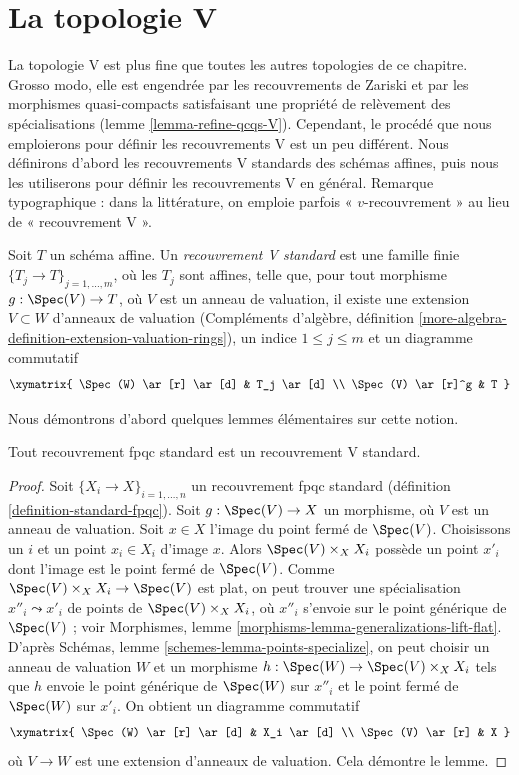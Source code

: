 \section{La topologie V}
\label{section-V}

\noindent
La topologie V est plus fine que toutes les autres topologies de ce chapitre.
Grosso modo, elle est engendrée par les recouvrements de Zariski et
par les morphismes quasi-compacts satisfaisant une propriété de relèvement
des spécialisations (lemme \ref{lemma-refine-qcqs-V}).
Cependant, le procédé que nous emploierons pour définir les recouvrements V est un peu différent.
Nous définirons d'abord les recouvrements V standards des schémas affines, puis
nous les utiliserons pour définir les recouvrements V en général. Remarque typographique :
dans la littérature, on emploie parfois « $v$-recouvrement » au lieu de « recouvrement V ».

\begin{definition}
\label{definition-standard-V-covering}
Soit $T$ un schéma affine. Un {\it recouvrement V standard} est une famille finie
$\{T_j \to T\}_{j = 1, \ldots, m}$, où les $T_j$ sont affines,
telle que, pour tout morphisme $g : \Spec(V) \to T$, où $V$
est un anneau de valuation, il existe une extension $V \subset W$ d'anneaux de valuation
(Compléments d'algèbre, définition
\ref{more-algebra-definition-extension-valuation-rings}),
un indice $1 \leq j \leq m$ et un diagramme commutatif
$$
\xymatrix{
\Spec(W) \ar[r] \ar[d] & T_j \ar[d] \\
\Spec(V) \ar[r]^g & T
}
$$
\end{definition}

\noindent
Nous démontrons d'abord quelques lemmes élémentaires sur cette notion.

\begin{lemma}
\label{lemma-standard-fpqc-standard-V}
Tout recouvrement fpqc standard est un recouvrement V standard.
\end{lemma}

\begin{proof}
Soit $\{X_i \to X\}_{i = 1, \ldots, n}$ un recouvrement fpqc standard
(définition \ref{definition-standard-fpqc}). Soit $g : \Spec(V) \to X$
un morphisme, où $V$ est un anneau de valuation. Soit $x \in X$
l'image du point fermé de $\Spec(V)$. Choisissons un $i$ et un point
$x_i \in X_i$ d'image $x$. Alors $\Spec(V) \times_X X_i$
possède un point $x'_i$ dont l'image est le point fermé de $\Spec(V)$.
Comme $\Spec(V) \times_X X_i \to \Spec(V)$ est plat,
on peut trouver une spécialisation $x''_i \leadsto x'_i$ de
points de $\Spec(V) \times_X X_i$, où $x''_i$ s'envoie sur
le point générique de $\Spec(V)$ ; voir
Morphismes, lemme \ref{morphisms-lemma-generalizations-lift-flat}. D'après
Schémas, lemme \ref{schemes-lemma-points-specialize},
on peut choisir un anneau de valuation $W$ et un morphisme
$h : \Spec(W) \to \Spec(V) \times_X X_i$ tels que $h$
envoie le point générique de $\Spec(W)$ sur $x''_i$ et le
point fermé de $\Spec(W)$ sur $x'_i$. On obtient un
diagramme commutatif
$$
\xymatrix{
\Spec(W) \ar[r] \ar[d] & X_i \ar[d] \\
\Spec(V) \ar[r] & X
}
$$
où $V \to W$ est une extension d'anneaux de valuation.
Cela démontre le lemme.
\end{proof}

